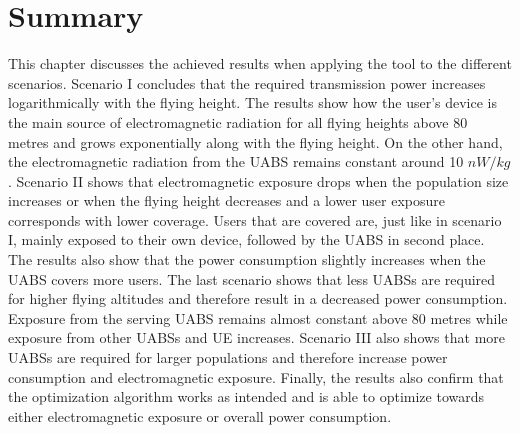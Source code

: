 \section{Summary}
This chapter discusses the achieved results when applying the tool to the different scenarios.
Scenario I concludes that the required transmission power increases logarithmically with the flying height.
The results show how the user's device is the main source of electromagnetic radiation 
for all flying heights above 80 metres and grows exponentially along with the flying height. 
On the other hand, the electromagnetic 
radiation from the \gls{UABS} remains constant around 10 $nW/kg$.
Scenario II shows that electromagnetic exposure  drops when the population size increases or when the flying height decreases
and a lower user exposure corresponds with lower coverage. Users that are covered are, just like in scenario I, 
mainly exposed to their own device, followed by the \gls{UABS} in second place. The results also show that 
the power consumption slightly increases when the \gls{UABS} covers more users.
The last scenario shows that less \gls{UABS}s are required for higher flying altitudes and therefore 
result in a decreased power consumption.  Exposure from the serving \gls{UABS} remains almost constant above 80 metres while 
exposure from other \gls{UABS}s and \gls{UE} increases. Scenario III also shows that more \gls{UABS}s are 
required for larger populations and therefore increase power consumption and electromagnetic exposure.
Finally, the results also confirm that the optimization algorithm works as intended 
and is able to optimize towards either electromagnetic exposure or overall power consumption.
